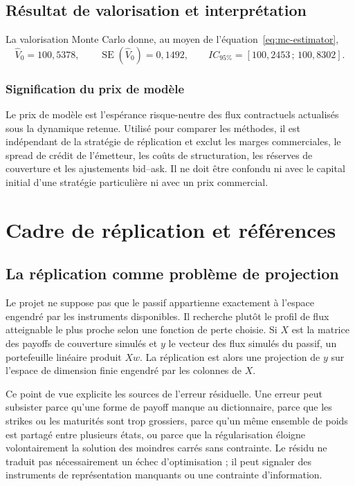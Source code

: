 \documentclass[12pt,a4paper]{article}
\newcommand{\1}{\mathbf{1}}
\begin{document}
\subsection{Résultat de valorisation et interprétation}

La valorisation Monte Carlo donne, au moyen de l'équation~\eqref{eq:mc-estimator},
\begin{equation}
 \widehat V_0=100{,}5378,\qquad
 \widehat{\operatorname{SE}}(\widehat V_0)=0{,}1492,
 \qquad IC_{95\%}=[100{,}2453\,;\,100{,}8302].
\label{eq:model-price}
\end{equation}

\subsubsection*{Signification du prix de modèle}

Le prix de modèle est l'espérance risque-neutre des flux contractuels actualisés
sous la dynamique retenue. Utilisé pour comparer les méthodes, il est indépendant
de la stratégie de réplication et exclut les marges commerciales, le spread de
crédit de l'émetteur, les coûts de structuration, les réserves de couverture et
les ajustements bid--ask. Il ne doit être confondu ni avec le capital initial
d'une stratégie particulière ni avec un prix commercial.

\section{Cadre de réplication et références}

\subsection{La réplication comme problème de projection}

Le projet ne suppose pas que le passif appartienne exactement à l'espace engendré
par les instruments disponibles. Il recherche plutôt le profil de flux atteignable
le plus proche selon une fonction de perte choisie. Si $X$ est la matrice des
payoffs de couverture simulés et $y$ le vecteur des flux simulés du passif, un
portefeuille linéaire produit $Xw$. La réplication est alors une projection de
$y$ sur l'espace de dimension finie engendré par les colonnes de $X$.

Ce point de vue explicite les sources de l'erreur résiduelle. Une erreur peut
subsister parce qu'une forme de payoff manque au dictionnaire, parce que les
strikes ou les maturités sont trop grossiers, parce qu'un même ensemble de poids
est partagé entre plusieurs états, ou parce que la régularisation éloigne
volontairement la solution des moindres carrés sans contrainte. Le résidu ne
traduit pas nécessairement un échec d'optimisation ; il peut signaler des
instruments de représentation manquants ou une contrainte d'information.
\end{document}
